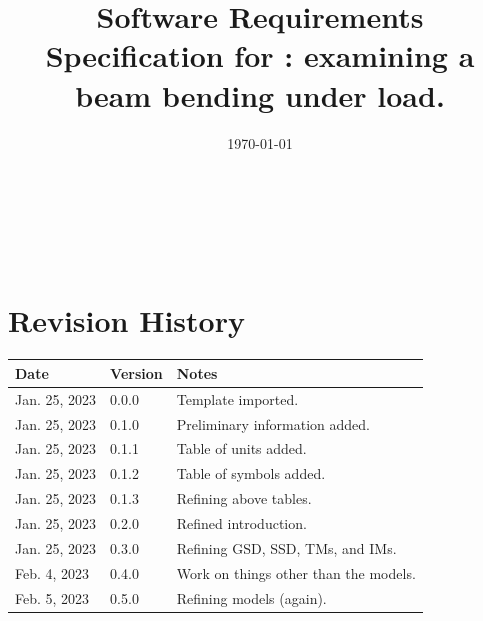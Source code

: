 \documentclass[12pt]{article}
\begin{document}
\ifcomments
    \todototoc
    \listoftodos
    \newpage
\fi


\title{Software Requirements Specification for \progname: examining a beam
    bending under load.}
\author{\authname}
\date{\today}

\maketitle

~\newpage


\tableofcontents

~\newpage


\section*{Revision History}

\begin{tabularx}{\textwidth}{p{3cm}p{2cm}X}
    \toprule {\bf Date} & {\bf Version} & {\bf Notes}                           \\
    \midrule
    Jan. 25, 2023       & 0.0.0         & Template imported.                    \\
    Jan. 25, 2023       & 0.1.0         & Preliminary information added.        \\
    Jan. 25, 2023       & 0.1.1         & Table of units added.                 \\
    Jan. 25, 2023       & 0.1.2         & Table of symbols added.               \\
    Jan. 25, 2023       & 0.1.3         & Refining above tables.                \\
    Jan. 25, 2023       & 0.2.0         & Refined introduction.                 \\
    Jan. 25, 2023       & 0.3.0         & Refining GSD, SSD, TMs, and IMs.      \\
    Feb. 4, 2023        & 0.4.0         & Work on things other than the models. \\
    Feb. 5, 2023        & 0.5.0         & Refining models (again).              \\
    \bottomrule
\end{tabularx}
\end{document}
